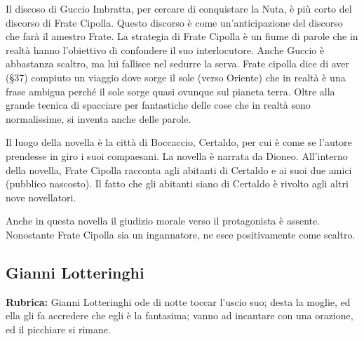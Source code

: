 \documentclass[a4paper]{article}
\begin{document}
Il discoso di Guccio Imbratta, per cercare di conquistare la Nuta, è più corto del discorso di Frate Cipolla.
Questo discorso è come un'anticipazione del discorso che farà il amestro Frate.
La strategia di Frate Cipolla è un fiume di parole che in realtà hanno l'obiettivo di confondere il suo interlocutore.
Anche Guccio è abbastanza scaltro, ma lui fallisce nel sedurre la serva.
Frate cipolla dice di aver (§37) compiuto un viaggio dove sorge il sole (verso Oriente)
che in realtà è una frase ambigua perché il sole sorge quasi ovunque sul pianeta terra.
Oltre alla grande tecnica di spacciare per fantastiche delle cose che in realtà sono normalissime,
si inventa anche delle parole.

Il luogo della novella è la città di Boccaccio, Certaldo, per cui è come se l'autore prendesse in giro i suoi compaesani.
La novella è narrata da Dioneo.
All'interno della novella, Frate Cipolla racconta agli abitanti di Certaldo e ai suoi due amici (pubblico nascosto).
Il fatto che gli abitanti siano di Certaldo è rivolto agli altri nove novellatori.

Anche in questa novella il giudizio morale verso il protagonista è assente.
Nonostante Frate Cipolla sia un ingannatore, ne esce positivamente come scaltro.


\pagebreak

\subsection{Gianni Lotteringhi}

\textbf{Rubrica:} Gianni Lotteringhi ode di notte toccar l'uscio suo; desta la moglie, ed ella gli fa accredere che egli è la fantasima; vanno ad incantare con una orazione, ed il picchiare si rimane.

\end{document}
